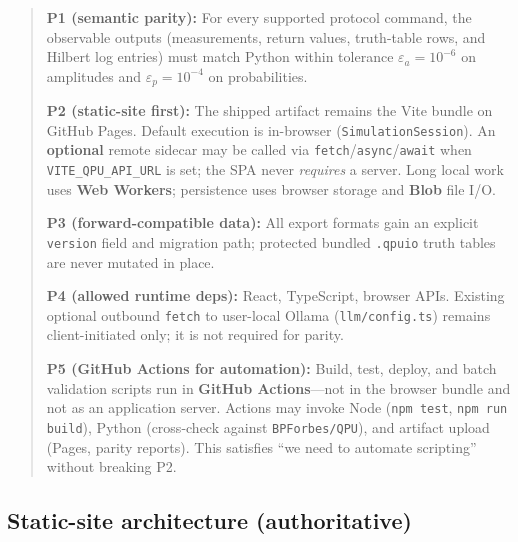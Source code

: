 \documentclass[11pt,a4paper]{article}
\begin{document}
\begin{quote}
\textbf{P1 (semantic parity):} For every supported protocol command, the observable outputs (measurements, return values, truth-table rows, and Hilbert log entries) must match Python within tolerance $\varepsilon_a=10^{-6}$ on amplitudes and $\varepsilon_p=10^{-4}$ on probabilities.

\textbf{P2 (static-site first):} The shipped artifact remains the Vite bundle on GitHub Pages. Default execution is in-browser (\texttt{SimulationSession}). An \textbf{optional} remote sidecar may be called via \texttt{fetch}/\texttt{async}/\texttt{await} when \texttt{VITE\_QPU\_API\_URL} is set; the SPA never \emph{requires} a server. Long local work uses \textbf{Web Workers}; persistence uses browser storage and \textbf{Blob} file I/O.

\textbf{P3 (forward-compatible data):} All export formats gain an explicit \texttt{version} field and migration path; protected bundled \texttt{.qpuio} truth tables are never mutated in place.

\textbf{P4 (allowed runtime deps):} React, TypeScript, browser APIs. Existing optional outbound \texttt{fetch} to user-local Ollama (\texttt{llm/config.ts}) remains client-initiated only; it is not required for parity.

\textbf{P5 (GitHub Actions for automation):} Build, test, deploy, and batch validation scripts run in \textbf{GitHub Actions}---not in the browser bundle and not as an application server. Actions may invoke Node (\texttt{npm test}, \texttt{npm run build}), Python (cross-check against \texttt{BPForbes/QPU}), and artifact upload (Pages, parity reports). This satisfies ``we need to automate scripting'' without breaking P2.
\end{quote}

\subsection{Static-site architecture (authoritative)}
\end{document}
